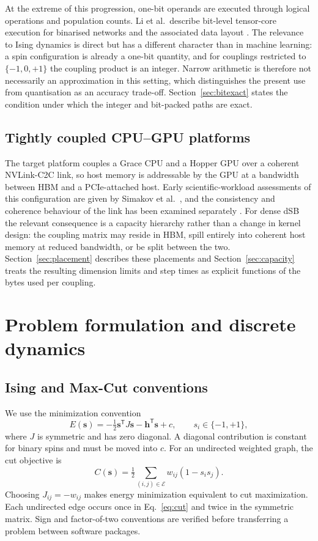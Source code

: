 \documentclass[11pt,a4paper]{article}
\begin{document}
At the extreme of this progression, one-bit operands are executed through logical operations and population counts. Li et al.\ describe bit-level tensor-core execution for binarised networks and the associated data layout \cite{li2019bstc,li2021bittc}. The relevance to Ising dynamics is direct but has a different character than in machine learning: a spin configuration is already a one-bit quantity, and for couplings restricted to $\{-1,0,+1\}$ the coupling product is an integer. Narrow arithmetic is therefore not necessarily an approximation in this setting, which distinguishes the present use from quantisation as an accuracy trade-off. Section~\ref{sec:bitexact} states the condition under which the integer and bit-packed paths are exact.

\subsection{Tightly coupled CPU--GPU platforms}
The target platform couples a Grace CPU and a Hopper GPU over a coherent NVLink-C2C link, so host memory is addressable by the GPU at a bandwidth between HBM and a PCIe-attached host. Early scientific-workload assessments of this configuration are given by Simakov et al.~\cite{simakov2024}, and the consistency and coherence behaviour of the link has been examined separately \cite{bagchi2026}. For dense dSB the relevant consequence is a capacity hierarchy rather than a change in kernel design: the coupling matrix may reside in HBM, spill entirely into coherent host memory at reduced bandwidth, or be split between the two. Section~\ref{sec:placement} describes these placements and Section~\ref{sec:capacity} treats the resulting dimension limits and step times as explicit functions of the bytes used per coupling.

\section{Problem formulation and discrete dynamics}\label{sec:formulation}
\subsection{Ising and Max-Cut conventions}
We use the minimization convention
\begin{equation}
 E(\boldsymbol{s})=-\tfrac12\boldsymbol{s}^{\mathsf T}J\boldsymbol{s}
 -\boldsymbol{h}^{\mathsf T}\boldsymbol{s}+c,\qquad s_i\in\{-1,+1\},
 \label{eq:ising}
\end{equation}
where $J$ is symmetric and has zero diagonal. A diagonal contribution is constant for binary spins and must be moved into $c$. For an undirected weighted graph, the cut objective is
\begin{equation}
 C(\boldsymbol{s})=\tfrac12\sum_{(i,j)\in\mathcal E}w_{ij}(1-s_i s_j).
 \label{eq:cut}
\end{equation}
Choosing $J_{ij}=-w_{ij}$ makes energy minimization equivalent to cut maximization. Each undirected edge occurs once in Eq.~\eqref{eq:cut} and twice in the symmetric matrix. Sign and factor-of-two conventions are verified before transferring a problem between software packages.
\end{document}
